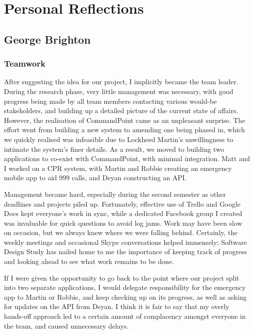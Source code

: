 \documentclass[]{article}
\begin{document}
\pagebreak
    \section{Personal Reflections}
    \subsection{George Brighton}

    \subsubsection*{Teamwork}

    After suggesting the idea for our project, I implicitly became the team leader. During the research phase, very little management was necessary, with good progress being made by all team members contacting various would-be stakeholders, and building up a detailed picture of the current state of affairs. However, the realisation of CommandPoint came as an unpleasant surprise. The effort went from building a new system to amending one being phased in, which we quickly realised was infeasible due to Lockheed Martin's unwillingness to intimate the system's finer details. As a result, we moved to building two applications to co-exist with CommandPoint, with minimal integration. Matt and I worked on a CPR system, with Martin and Robbie creating an emergency mobile app to aid 999 calls, and Deyan constructing an API.

    Management became hard, especially during the second semester as other deadlines and projects piled up. Fortunately, effective use of Trello and Google Docs kept everyone's work in sync, while a dedicated Facebook group I created was invaluable for quick questions to avoid log jams. Work may have been slow on occasion, but we always knew where we were falling behind. Certainly, the weekly meetings and occasional Skype conversations helped immensely; Software Design Study has nailed home to me the importance of keeping track of progress and looking ahead to see what work remains to be done.

    If I were given the opportunity to go back to the point where our project split into two separate applications, I would delegate responsibility for the emergency app to Martin or Robbie, and keep checking up on its progress, as well as asking for updates on the API from Deyan. I think it is fair to say that my overly hands-off approach led to a certain amount of complacency amongst everyone in the team, and caused unnecessary delays.
\end{document}
